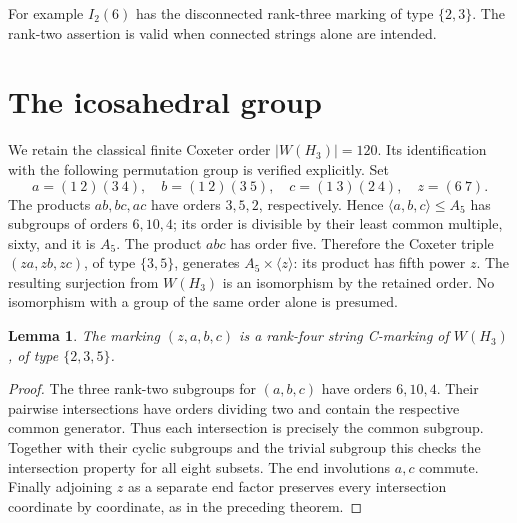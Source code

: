 \documentclass[11pt,a4paper]{article}
\newtheorem{lemma}[theorem]{Lemma}
\newcommand{\gen}[1]{\langle#1\rangle}
\begin{document}
For example $I_2(6)$ has the disconnected rank-three marking of type
$\{2,3\}$. The rank-two assertion is valid when connected strings alone
are intended.

\section{The icosahedral group}
We retain the classical finite Coxeter order $|W(H_3)|=120$. Its
identification with the following permutation group is verified explicitly.
Set
\[
 a=(1\ 2)(3\ 4),\quad b=(1\ 2)(3\ 5),\quad
 c=(1\ 3)(2\ 4),\quad z=(6\ 7).
\]
The products $ab,bc,ac$ have orders $3,5,2$, respectively. Hence
$\gen{a,b,c}\le A_5$ has subgroups of orders $6,10,4$; its order is
divisible by their least common multiple, sixty, and it is $A_5$.
The product $abc$ has order five. Therefore the Coxeter triple
$(za,zb,zc)$, of type $\{3,5\}$, generates $A_5\times\gen z$: its
product has fifth power $z$. The resulting surjection from $W(H_3)$ is
an isomorphism by the retained order. No isomorphism with a group of the
same order alone is presumed.

\begin{lemma}
The marking $(z,a,b,c)$ is a rank-four string C-marking of $W(H_3)$,
of type $\{2,3,5\}$.
\end{lemma}
\begin{proof}
The three rank-two subgroups for $(a,b,c)$ have orders $6,10,4$.
Their pairwise intersections have orders dividing two and contain the
respective common generator. Thus each intersection is precisely the
common subgroup. Together with their cyclic subgroups and the trivial
subgroup this checks the intersection property for all eight subsets.
The end involutions $a,c$ commute. Finally adjoining $z$ as a separate
end factor preserves every intersection coordinate by coordinate, as in
the preceding theorem.
\end{proof}
\end{document}
